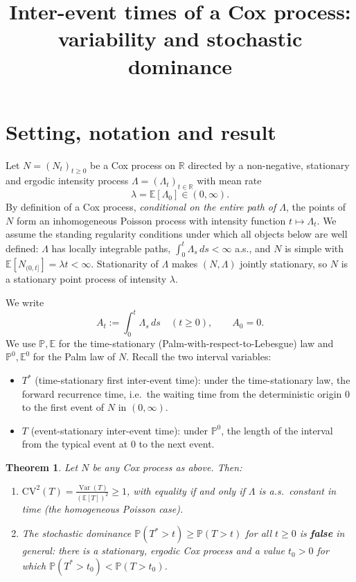 \documentclass{amsart}
\theoremstyle{plain}
\newtheorem{theorem}{Theorem}
\theoremstyle{definition}
\newcommand{\E}{\mathbb{E}}
\newcommand{\Prob}{\mathbb{P}}
\newcommand{\R}{\mathbb{R}}
\newcommand{\Lam}{\Lambda}
\DeclareMathOperator{\Var}{Var}
\begin{document}
\title{Inter-event times of a Cox process: variability and stochastic dominance}
\maketitle

\section{Setting, notation and result}

Let $N=(N_t)_{t\ge0}$ be a Cox process on $\R$ directed by a non-negative,
stationary and ergodic intensity process $\Lam=(\Lam_t)_{t\in\R}$ with mean rate
\[
  \lambda=\E[\Lam_0]\in(0,\infty).
\]
By definition of a Cox process, \emph{conditional on the entire path of $\Lam$}, the
points of $N$ form an inhomogeneous Poisson process with intensity function
$t\mapsto\Lam_t$. We assume the standing regularity conditions under which all objects
below are well defined: $\Lam$ has locally integrable paths,
$\int_0^t\Lam_s\,ds<\infty$ a.s., and $N$ is simple with
$\E[N_{(0,t]}]=\lambda t<\infty$. Stationarity of $\Lam$ makes $(N,\Lam)$ jointly
stationary, so $N$ is a stationary point process of intensity $\lambda$.

We write
\begin{equation}\label{eq:Adef}
  A_t:=\int_0^t\Lam_s\,ds\quad(t\ge0),\qquad A_0=0 .
\end{equation}
We use $\Prob,\E$ for the time-stationary (Palm-with-respect-to-Lebesgue) law and
$\Prob^0,\E^0$ for the Palm law of $N$. Recall the two interval variables:
\begin{itemize}
\item $T^\ast$ (time-stationary first inter-event time): under the time-stationary
law, the forward recurrence time, i.e.\ the waiting time from the deterministic origin
$0$ to the first event of $N$ in $(0,\infty)$.
\item $T$ (event-stationary inter-event time): under $\Prob^0$, the length of the
interval from the typical event at $0$ to the next event.
\end{itemize}

\begin{theorem}\label{thm:main}
Let $N$ be any Cox process as above. Then:
\begin{enumerate}
\item[\textup{(1)}] $\displaystyle \mathrm{CV}^2(T)=\frac{\Var(T)}{(\E[T])^2}\ge1$,
with equality if and only if $\Lam$ is a.s.\ constant in time (the homogeneous Poisson
case).
\item[\textup{(2)}] The stochastic dominance $\Prob(T^\ast>t)\ge\Prob(T>t)$ for all
$t\ge0$ is \textbf{false} in general: there is a stationary, ergodic Cox process and a
value $t_0>0$ for which $\Prob(T^\ast>t_0)<\Prob(T>t_0)$.
\end{enumerate}
\end{theorem}
\end{document}
